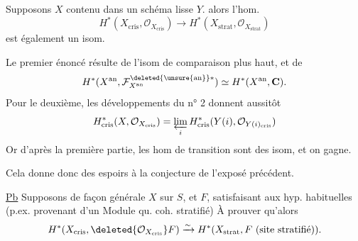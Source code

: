Supposons $X$ contenu dans un schéma lisse $Y$.
 alors l'hom. 
\[
H^*(X_{\mathrm{cris}},\mathcal O_{X_{\mathrm{cris}}})\longrightarrow H^*(X_{\mathrm{strat}},\mathcal O_{X_{\mathrm{strat}}})
\]
est également un isom.

Le premier énoncé résulte de l'isom de comparaison plus haut, et de
\[
H^*(X^{\mathrm{an}},\mathcal F_{X^{\mathrm{an}}}^{\deleted{\unsure{\mathrm{an}}}*})\simeq H^*(X^{\mathrm{an}},\mathbf C).
\]
Pour le deuxième, les développements du n° 2 donnent aussitôt
\[
H^*_{\mathrm{cris}}(X,\mathcal O_{X_{\mathrm{cris}}})=\varprojlim_i H^*_{\mathrm{cris}}(Y(i),\mathcal O_{Y(i)_{\mathrm{cris}}})
\]
Or d'après la première partie, les hom de transition sont des isom, et on gagne.

Cela donne donc des espoirs à la conjecture de l'exposé précédent.

\uline{Pb} Supposons de façon générale $X$  sur $S$, et $F$, satisfaisant aux hyp. habituelles (p.ex. provenant d'un Module qu. coh. stratifié) À prouver qu'alors
\[
H^*(X_{\mathrm{cris}},\deleted{\mathcal O_{X_{\mathrm{cris}}}}F)\xrightarrow{\sim}H^*(X_{\mathrm{strat}},F\ (\text{site stratifié})).
\]
